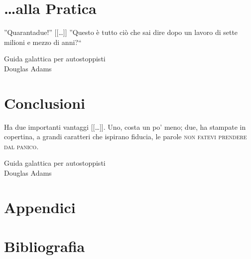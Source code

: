 \documentclass[10pt,a4paper,cleardoubleempty]{scrbook}
\begin{document}






\cleardoublepage
\part{\ldots alla Pratica}

\thispagestyle{empty}
\null{}
\begin{flushright}
\setlength{\epigraphwidth}{21em}
\epigraph{
\footnotesize{''Quarantadue!'' $[[$\ldots$]]$ ''Questo è tutto ciò che sai dire dopo un lavoro di sette milioni e mezzo di anni{?}``}
}{\footnotesize{Guida galattica per autostoppisti\\ Douglas Adams}}
\end{flushright}\null






\cleardoublepage
\part{Conclusioni}

\thispagestyle{empty}
\null{}
\begin{flushright}
\setlength{\epigraphwidth}{21em}
\epigraph{
\footnotesize{Ha due importanti vantaggi $[[$\ldots$]]$. Uno, costa un po' meno; due, ha stampate in copertina, a grandi caratteri che ispirano fiducia, le parole \textsc{non fatevi prendere dal panico}.}
}{\footnotesize{Guida galattica per autostoppisti\\ Douglas Adams}}
\end{flushright}\null




\appendix

\cleardoublepage
\part{Appendici}




\nocite{*}
\cleardoublepage
\part{Bibliografia}
{}

\end{document}
